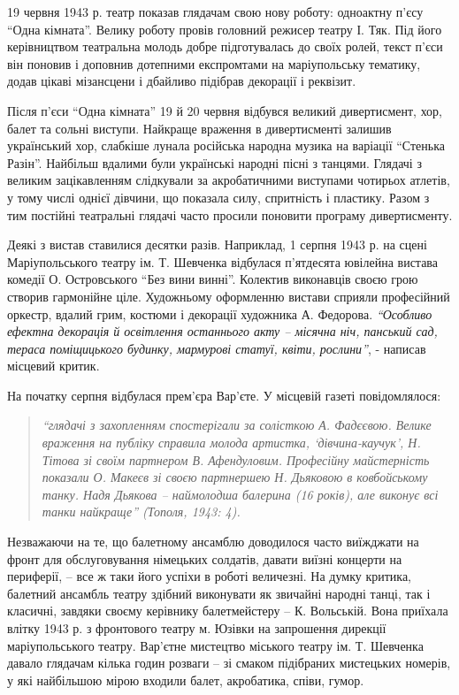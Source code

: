 19 червня 1943 р. театр показав глядачам свою нову роботу: одноактну п'єсу
\enquote{Одна кімната}. Велику роботу провів головний режисер театру І. Тяк. Під його
керівництвом театральна молодь добре підготувалась до своїх ролей, текст п'єси
він поновив і доповнив дотепними експромтами на маріупольську тематику, додав
цікаві мізансцени і дбайливо підібрав декорації і реквізит.

Після п'єси \enquote{Одна кімната} 19 й 20 червня відбувся великий дивертисмент, хор,
балет та сольні виступи. Найкраще враження в дивертисменті залишив український
хор, слабкіше лунала російська народна музика на варіації \enquote{Стенька Разін}.
Найбільш вдалими були українські народні пісні з танцями. Глядачі з великим
зацікавленням слідкували за акробатичними виступами чотирьох атлетів, у тому
числі однієї дівчини, що показала силу, спритність і пластику. Разом з тим
постійні театральні глядачі часто просили поновити програму дивертисменту. 

Деякі з вистав ставилися десятки разів. Наприклад, 1 серпня 1943 р. на сцені
Маріупольського театру ім. Т. Шевченка відбулася п'ятдесята ювілейна вистава
комедії О. Островського \enquote{Без вини винні}. Колектив виконавців своєю грою
створив гармонійне ціле. Художньому оформленню вистави сприяли професійний
оркестр, вдалий грим, костюми і декорації художника А. Федорова. \emph{\enquote{Особливо
ефектна декорація й освітлення останнього акту – місячна ніч, панський сад,
тераса поміщицького будинку, мармурові статуї, квіти, рослини}}, - написав
місцевий критик.

На початку серпня відбулася прем'єра Вар'єте. У місцевій газеті повідомлялося:

\begin{quote}
\em\enquote{глядачі з захопленням спостерігали за солісткою А. Фадєєвою. Велике враження
на публіку справила молода артистка, \enquote{дівчина-каучук}, Н. Тітова зі своїм
партнером В. Афендуловим. Професійну майстерність показали О. Макеєв зі своєю
партнершею Н. Дьяковою в ковбойському танку. Надя Дьякова – наймолодша балерина
(16 років), але виконує всі танки найкраще} (Тополя, 1943: 4). 
\end{quote}

Незважаючи на те, що балетному ансамблю доводилося часто виїжджати на фронт для
обслуговування німецьких солдатів, давати виїзні концерти на периферії, – все ж
таки його успіхи в роботі величезні. На думку критика, балетний ансамбль театру
здібний виконувати як звичайні народні танці, так і класичні, завдяки своєму
керівнику балетмейстеру – К. Вольській. Вона приїхала влітку 1943 р. з
фронтового театру м. Юзівки на запрошення дирекції маріупольського театру.
Вар'єтне мистецтво міського театру ім. Т.  Шевченка давало глядачам кілька
годин розваги – зі смаком підібраних мистецьких номерів, у які найбільшою мірою
входили балет, акробатика, співи, гумор.

